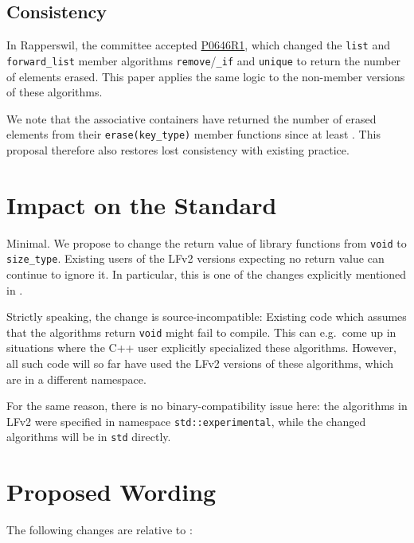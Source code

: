 \documentclass[11pt]{article}
\newcommand{\wgpaper}[1]{\href{https://wg21.link/#1}{#1}}
\begin{document}
\subsection{Consistency}

In Rapperswil, the committee accepted \wgpaper{P0646R1}, which changed
the \texttt{list} and \texttt{forward\_list} member algorithms
\texttt{remove}/\texttt{\_if} and \texttt{unique} to return the number
of elements erased. This paper applies the same logic to the
non-member versions of these algorithms.

We note that the associative containers have returned the number of
erased elements from their \texttt{erase(key\_type)} member functions
since at least \cite{STL}. This proposal therefore also restores
lost consistency with existing practice.

\section{Impact on the Standard}

Minimal. We propose to change the return value of library functions
from \texttt{void} to \texttt{size\_type}. Existing users of the LFv2
versions expecting no return value can continue to ignore it. In
particular, this is one of the changes explicitly mentioned in
\cite{P0921R2}.

Strictly speaking, the change is source-incompatible: Existing code
which assumes that the algorithms return \texttt{void} might fail to
compile. This can e.g.\ come up in situations where the C++ user
explicitly specialized these algorithms. However, all such code will
so far have used the LFv2 versions of these algorithms, which are in a
different namespace.

For the same reason, there is no binary-compatibility issue here: the
algorithms in LFv2 were specified in namespace
\texttt{std::experimental}, while the changed algorithms will be in
\texttt{std} directly.

\section{Proposed Wording}
\label{wording}

The following changes are relative to \cite{N4830}:
\end{document}
